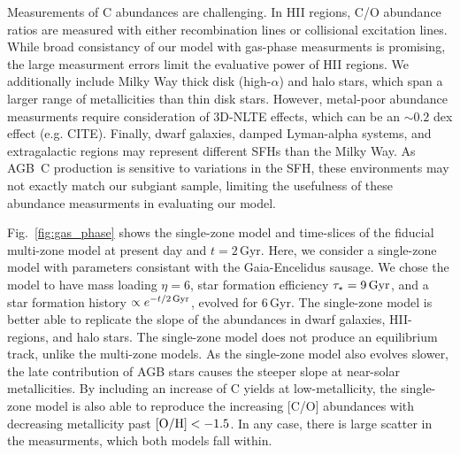 \documentclass[fleqn,usenatbib]{mnras}
\newcommand{\agb}{AGB}
\newcommand{\sfh}{SFH} %
\newcommand{\about}[1]{${\sim} #1$}
\begin{document}
Measurements of C abundances are challenging. 
In HII regions, C/O abundance ratios are measured with either recombination lines or collisional excitation lines. While broad consistancy of our model with gas-phase measurments is promising, the large measurment errors limit the evaluative power of HII regions.
We additionally include Milky Way thick disk (high-$\alpha$) and halo stars, which span a larger range of metallicities than thin disk stars. However, metal-poor abundance measurments require consideration of 3D-NLTE effects, which can be an \about{0.2} dex effect  (e.g. CITE). 
Finally, dwarf galaxies, damped Lyman-alpha systems, and extragalactic regions may represent different \sfh{}s than the Milky Way.
As \agb\ C production is sensitive to variations in the \sfh, these environments may not exactly match our subgiant sample, limiting the usefulness of these abundance measurments in evaluating our model.


Fig.~\ref{fig:gas_phase} shows the single-zone model and time-slices of the fiducial multi-zone model at present day and $t=2$\,Gyr. 
Here, we consider a single-zone model with parameters consistant with the Gaia-Encelidus sausage\footnotemark{}. We chose the model to have mass loading $\eta=6$, star formation efficiency $\tau_{\star}=9\,{\rm Gyr}$, and a star formation history $\propto e^{-t/2{\rm\,Gyr}}$, evolved for 6\,Gyr. 
The single-zone model is better able to replicate the slope of the abundances in dwarf galaxies, HII-regions, and halo stars. The single-zone model does not produce an equilibrium track, unlike the multi-zone models. As the single-zone model also evolves slower, the late contribution of AGB stars causes the steeper slope at near-solar metallicities. By including an increase of C yields at low-metallicity, the single-zone model is also able to reproduce the increasing [C/O] abundances with decreasing metallicity past ${\rm [O/H]} < -1.5$. In any case, there is large scatter in the measurments, which both models fall within.



\end{document}
